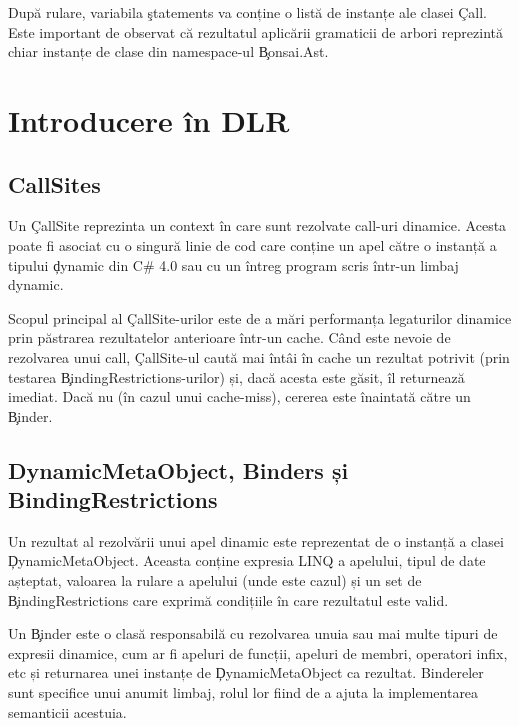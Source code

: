 \documentclass[12pt,a4paper]{memoir}
\begin{document}
După rulare, variabila \c{statements} va conține o listă de instanțe ale clasei \c{Call}. Este important de observat că rezultatul aplicării gramaticii de arbori reprezintă chiar instanțe de clase din namespace-ul \c{Bonsai.Ast}.

\chapter{Introducere în DLR}


\section{CallSites}

Un \c{CallSite} reprezinta un context în care sunt rezolvate call-uri dinamice. Acesta poate fi asociat cu o singură linie de cod care conține un apel către o instanță a tipului \c{dynamic} din C\# 4.0\cite{csharp_4_specs} sau cu un întreg program scris într-un limbaj dynamic. 

Scopul principal al \c{CallSite}-urilor este de a mări performanța legaturilor dinamice prin păstrarea rezultatelor anterioare într-un cache. Când este nevoie de rezolvarea unui call, \c{CallSite}-ul caută mai întâi în cache un rezultat potrivit (prin testarea \c{BindingRestrictions}-urilor) și, dacă acesta este găsit, îl returnează imediat. Dacă nu (în cazul unui cache-miss), cererea este înaintată către un \c{Binder}.

\section{DynamicMetaObject, Binders și BindingRestrictions}

Un rezultat al rezolvării unui apel dinamic este reprezentat de o instanță a clasei \c{DynamicMetaObject}\cite{dynamic_meta_object}. Aceasta conține expresia LINQ\cite{linq_expressions} a apelului, tipul de date așteptat, valoarea la rulare a apelului (unde este cazul) și un set de \c{BindingRestrictions} care exprimă condițiile în care rezultatul este valid.

Un \c{Binder} este o clasă responsabilă cu rezolvarea unuia sau mai multe tipuri de expresii dinamice, cum ar fi apeluri de funcții, apeluri de membri, operatori infix, etc și returnarea unei instanțe de \c{DynamicMetaObject} ca rezultat. Bindereler sunt specifice unui anumit limbaj, rolul lor fiind de a ajuta la implementarea semanticii acestuia.
\end{document}

